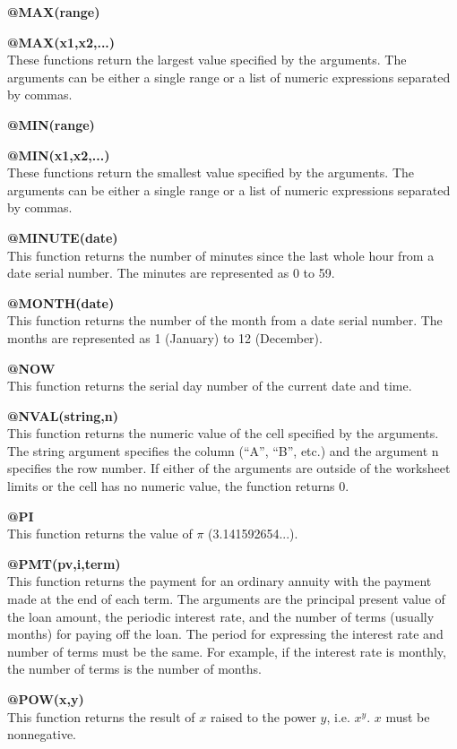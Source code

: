 {\bf @MAX(range)}

{\bf @MAX(x1,x2,...)}\\
    These functions return the largest value specified by the arguments.  The 
arguments can be either a single range or a list of numeric expressions 
separated by commas.

{\bf @MIN(range)}

{\bf @MIN(x1,x2,...)}\\
    These functions return the smallest value specified by the arguments.  The 
arguments can be either a single range or a list of numeric expressions 
separated by commas.

{\bf @MINUTE(date)}\\
    This function returns the number of minutes since the last whole hour from 
a date serial number.  The minutes are represented as 0 to 59.

{\bf @MONTH(date)}\\
    This function returns the number of the month from a date serial number.  
The months are represented as 1 (January) to 12 (December).

{\bf @NOW}\\
    This function returns the serial day number of the current date and time.

{\bf @NVAL(string,n)}\\
    This function returns the numeric value of the cell specified by the 
arguments.  The string argument specifies the column (``A'', ``B'', etc.) and the
argument n specifies the row number.  If either of the arguments are outside 
of the worksheet limits or the cell has no numeric value, the function returns 
0.
 
{\bf @PI}\\
    This function returns the value of $\pi$ (3.141592654...).

{\bf @PMT(pv,i,term)}\\
    This function returns the payment for an ordinary annuity with the payment 
made at the end of each term.  The arguments are the principal present value 
of the loan amount, the periodic interest rate, and the number of terms 
(usually months) for paying off the loan.  The period for expressing the 
interest rate and number of terms must be the same.  For example, if the 
interest rate is monthly, the number of terms is the number of months.

{\bf @POW(x,y)}\\
    This function returns the result of $x$ raised to the power $y$, 
    i.e. $x^y$.  $x$ must be nonnegative.

